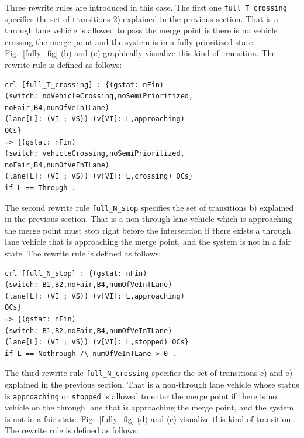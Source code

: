 \documentclass[10pt, conference, compsocconf]{IEEEtran}
\begin{document}

Three rewrite rules are introduced in this case.
The first one \verb!full_T_crossing! specifies the set of transitions 2) explained in the previous section.
That is a through lane vehicle is allowed to pass the merge point is there is no vehicle crossing the merge point and the system is in a fully-prioritized state.
Fig.~\ref{fully_fig} (b) and (c) graphically visualize this kind of transition.
The rewrite rule is defined as follows:

\begin{small}
\begin{verbatim}
crl [full_T_crossing] : {(gstat: nFin) 
(switch: noVehicleCrossing,noSemiPrioritized,
noFair,B4,numOfVeInTLane) 
(lane[L]: (VI ; VS)) (v[VI]: L,approaching) 
OCs} 
=> {(gstat: nFin) 
(switch: vehicleCrossing,noSemiPrioritized,
noFair,B4,numOfVeInTLane) 
(lane[L]: (VI ; VS)) (v[VI]: L,crossing) OCs} 
if L == Through .
\end{verbatim}
\end{small}


The second rewrite rule \verb!full_N_stop! specifies the set of transitions b) explained in the previous section.
That is a non-through lane vehicle which is approaching the merge point must stop right before the intersection if there exists a through lane vehicle that is approaching the merge point, and the system is not in a fair state. 
The rewrite rule is defined as follows:

\begin{small}
\begin{verbatim}
crl [full_N_stop] : {(gstat: nFin) 
(switch: B1,B2,noFair,B4,numOfVeInTLane) 
(lane[L]: (VI ; VS)) (v[VI]: L,approaching) 
OCs}
=> {(gstat: nFin)
(switch: B1,B2,noFair,B4,numOfVeInTLane) 
(lane[L]: (VI ; VS)) (v[VI]: L,stopped) OCs}
if L == Nothrough /\ numOfVeInTLane > 0 .
\end{verbatim}
\end{small}

The third rewrite rule \verb!full_N_crossing! specifies the set of transitions c) and e) explained in the previous section.
That is a non-through lane vehicle whose status is \verb!approaching! or \verb!stopped! is allowed to enter the merge point
if there is no vehicle on the through lane that is approaching the merge point, and the system is not in a fair state.
Fig.~\ref{fully_fig} (d) and (e) visualize this kind of transition.
The rewrite rule is defined as follows:
\end{document}
